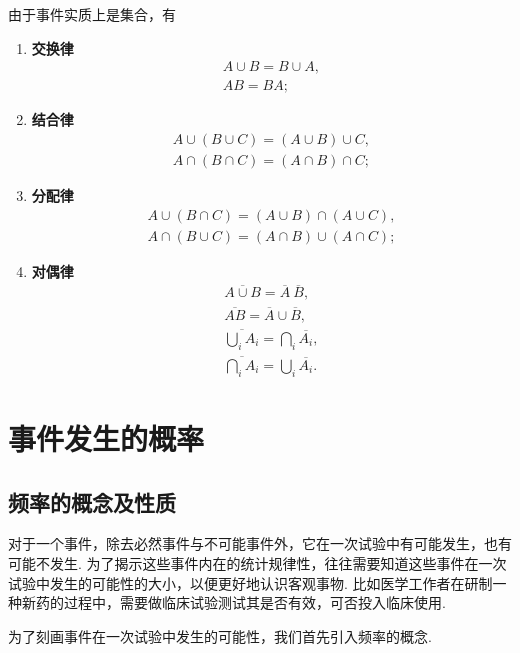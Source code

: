 \begin{theorem}[事件的运算规律]
由于事件实质上是集合，有
\begin{enumerate}
	\item {\bf 交换律}
	\begin{gather}
		A \cup B = B \cup A, \\
		A B = B A;
	\end{gather}

	\item {\bf 结合律}
	\begin{gather}
		A \cup (B \cup C) = (A \cup B) \cup C, \\
		A \cap (B \cap C) = (A \cap B) \cap C;
	\end{gather}

	\item {\bf 分配律}
	\begin{gather}
		A \cup (B \cap C) = (A \cup B) \cap (A \cup C), \\
		A \cap (B \cup C) = (A \cap B) \cup (A \cap C);
	\end{gather}

	\item {\bf 对偶律}
	\begin{gather}
		\overline{A \cup B} = \overline{A}\ \overline{B}, \\
		\overline{AB} = \overline{A} \cup \overline{B}, \\
		\overline{\bigcup_i A_i} = \bigcap_i \overline{A_i}, \\
		\overline{\bigcap_i A_i} = \bigcup_i \overline{A_i}.
	\end{gather}
\end{enumerate}
\end{theorem}

\section{事件发生的概率}

\subsection{频率的概念及性质}
对于一个事件，除去必然事件与不可能事件外，它在一次试验中有可能发生，也有可能不发生.
为了揭示这些事件内在的统计规律性，往往需要知道这些事件在一次试验中发生的可能性的大小，以便更好地认识客观事物.
比如医学工作者在研制一种新药的过程中，需要做临床试验测试其是否有效，可否投入临床使用.

为了刻画事件在一次试验中发生的可能性，我们首先引入频率的概念.

